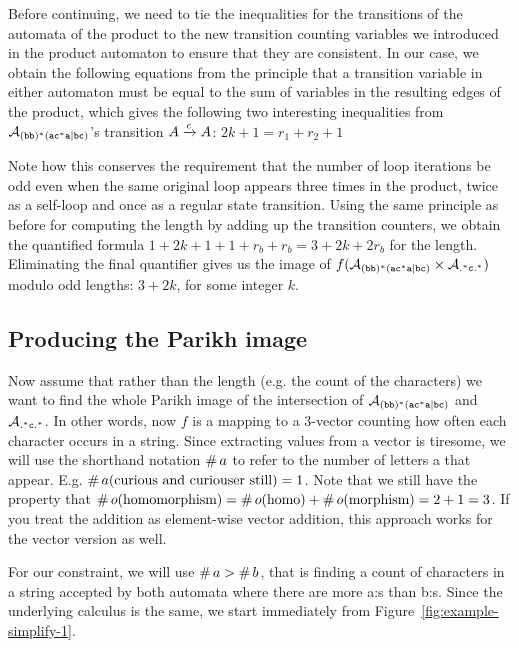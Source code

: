 \documentclass[acmsmall,review,anonymous,screen]{acmart}\settopmatter{printfolios=true,printccs=true,printacmref=true}
\theoremstyle{definition}
\begin{document}
Before continuing, we need to tie the inequalities for the transitions of the
automata of the product to the new transition counting variables we introduced
in the product automaton to ensure that they are consistent. In our case, we
obtain the following equations from the principle that a transition variable in
either automaton must be equal to the sum of variables in the resulting edges of
the product, which gives the following two interesting inequalities from
$\mathcal{A}_{\mathtt{(bb)^\ast(ac^\ast{}a|bc)}}{}$'s transition $A \xrightarrow{c} A$: $2k + 1 = r_1 + r_2 + 1$

Note how this conserves the requirement that the number of loop iterations be
odd even when the same original loop appears three times in the product, twice
as a self-loop and once as a regular state transition. Using the same principle
as before for computing the length by adding up the transition counters, we
obtain the quantified formula $1 + 2k + 1 + 1 + r_b + r_b= 3 + 2k + 2r_b$ for
the length. Eliminating the final quantifier gives us the image of $f(\mathcal{A}_{\mathtt{(bb)^\ast(ac^\ast{}a|bc)}}
\times \mathcal{A}_{\mathtt{.^\ast{}c.^\ast}})$ modulo odd lengths: $3 + 2k$, for some integer
$k$.

\subsection{Producing the Parikh image}\label{sec:introduction:parikh}

Now assume that rather than the length (e.g. the count of the characters) we
want to find the whole Parikh image of the intersection of $\mathcal{A}_{\mathtt{(bb)^\ast(ac^\ast{}a|bc)}}{}$ and
$\mathcal{A}_{\mathtt{.^\ast{}c.^\ast}}{}$. In other words, now $f$ is a mapping to a 3-vector
counting how often each character occurs in a string. Since extracting values
from a vector is tiresome, we will use the shorthand notation
$\operatorname{\#}{a}$ to refer to the number of letters a that appear. E.g.
$\operatorname{\#}{a}(\text{curious and curiouser still}) = 1$. Note that we
still have the property that $\operatorname{\#}{o}(\text{homomorphism}) =
\operatorname{\#}{o}(\text{homo}) + \operatorname{\#}{o}(\text{morphism}) = 2 + 1
= 3$. If you treat the addition as element-wise vector addition, this approach
works for the vector version as well.

For our constraint, we will use $\operatorname{\#}{a} > \operatorname{\#}{b}$,
that is finding a count of characters in a string accepted by both automata where
there are more a:s than b:s. Since the underlying calculus is the same, we start immediately from Figure~\ref{fig:example-simplify-1}.
\end{document}
